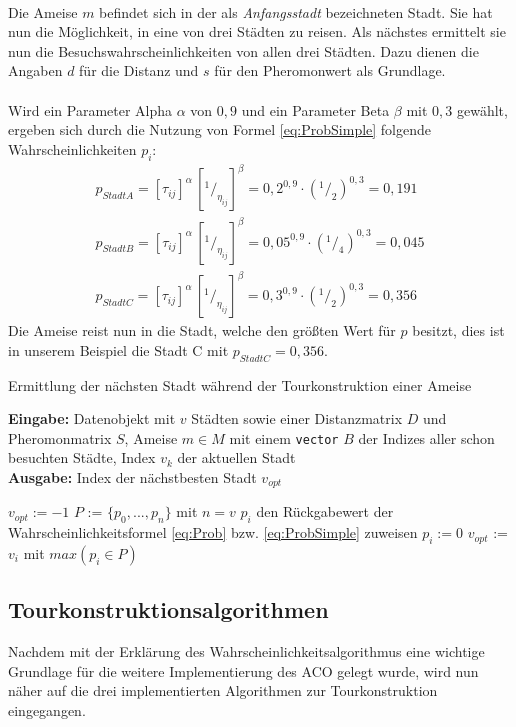 \documentclass[doktyp=barbeit, sprache=german]{TUBAFarbeiten}
\newcommand*\rfrac[2]{{}^{#1}\!/_{#2}}
\begin{document}
\\Die Ameise $m$ befindet sich in der als \textit{Anfangsstadt} bezeichneten Stadt. Sie hat nun die Möglichkeit, in eine von drei Städten zu reisen. Als nächstes ermittelt sie nun die Besuchswahrscheinlichkeiten von allen drei Städten. Dazu dienen die Angaben $d$ für die Distanz und $s$ für den Pheromonwert als Grundlage. \\\\Wird ein Parameter Alpha $\alpha$ von $0,9$ und ein Parameter Beta $\beta$ mit $0,3$ gewählt, ergeben sich durch die Nutzung von Formel \ref{eq:ProbSimple} folgende Wahrscheinlichkeiten $p_i$:
\begin{align}
\label{examplePheromone}
p_{Stadt A} = [\tau_{ij}]^\alpha \, [\rfrac{1}{\eta_{ij}}]^\beta = 0,2^{0,9} \cdot (\rfrac{1}{2})^{0,3} = 0,191 \nonumber
\\p_{Stadt B} = [\tau_{ij}]^\alpha \, [\rfrac{1}{\eta_{ij}}]^\beta = 0,05^{0,9} \cdot (\rfrac{1}{4})^{0,3} = 0,045 \nonumber
\\p_{Stadt C} = [\tau_{ij}]^\alpha \, [\rfrac{1}{\eta_{ij}}]^\beta = 0,3^{0,9} \cdot (\rfrac{1}{2})^{0,3} = 0,356 \nonumber
\end{align}
Die Ameise reist nun in die Stadt, welche den größten Wert für $p$ besitzt, dies ist in unserem Beispiel die Stadt C mit $p_{Stadt C} = 0,356$.
\begin{algorithm}
\caption{Ermittlung der nächsten Stadt während der Tourkonstruktion einer Ameise}
\label{probabilityAlg}
\textbf{Eingabe:} Datenobjekt mit $v$ Städten sowie einer Distanzmatrix $D$ und Pheromonmatrix $S$, Ameise $m \in M$ mit einem \texttt{vector} $B$ der Indizes aller schon besuchten Städte, Index $v_k$ der aktuellen Stadt
\\\textbf{Ausgabe:} Index der nächstbesten Stadt $v_{opt}$
\begin{algorithmic}[1]
\State $v_{opt} := -1$
\State $P$ := $\{p_0, ..., p_n\}$ mit $n = v$ 
\State $p_i$ den Rückgabewert der Wahrscheinlichkeitsformel \ref{eq:Prob} bzw. \ref{eq:ProbSimple} zuweisen
\Else 
\State $p_i := 0$
\EndIf
\EndFor
\State $v_{opt}$ := $v_i$ mit $max(p_i \in P)$
\end{algorithmic}
\end{algorithm}
\subsection{Tourkonstruktionsalgorithmen}
\label{sec:Tourkonstruktionsalgorithmen}
Nachdem mit der Erklärung des Wahrscheinlichkeitsalgorithmus eine wichtige Grundlage für die weitere Implementierung des ACO gelegt wurde, wird nun näher auf die drei implementierten Algorithmen zur Tourkonstruktion eingegangen.
\end{document}
